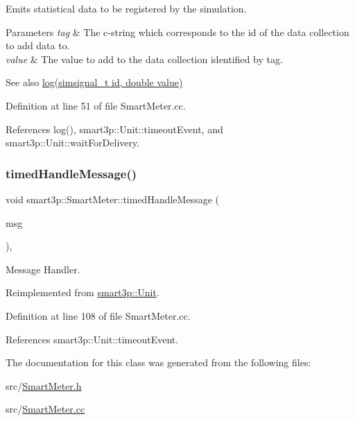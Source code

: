Emits statistical data to be registered by the simulation. 
\begin{DoxyParams}{Parameters}
{\em tag} & The c-\/string which corresponds to the id of the data collection to add data to. \\
\hline
{\em value} & The value to add to the data collection identified by tag. \\
\hline
\end{DoxyParams}
\begin{DoxySeeAlso}{See also}
\hyperlink{classsmart3p_1_1SmartMeter_ac65e2f27b0a9d2545000baac6e1e574d}{log(simsignal\+\_\+t id, double value)} 
\end{DoxySeeAlso}


Definition at line 51 of file Smart\+Meter.\+cc.



References log(), smart3p\+::\+Unit\+::timeout\+Event, and smart3p\+::\+Unit\+::wait\+For\+Delivery.

\mbox{\label{classsmart3p_1_1SmartMeter_a3491294618643d423e8fd3578eb3a439}} 
\subsubsection{\texorpdfstring{timed\+Handle\+Message()}{timedHandleMessage()}}
{\footnotesize\ttfamily void smart3p\+::\+Smart\+Meter\+::timed\+Handle\+Message (\begin{DoxyParamCaption}\item[{c\+Message $\ast$}]{msg }\end{DoxyParamCaption})\hspace{0.3cm}{\ttfamily [protected]}, {\ttfamily [virtual]}}



Message Handler. 



Reimplemented from \hyperlink{classsmart3p_1_1Unit_a93f16f43dec69d23d8588f3b60c96d69}{smart3p\+::\+Unit}.



Definition at line 108 of file Smart\+Meter.\+cc.



References smart3p\+::\+Unit\+::timeout\+Event.



The documentation for this class was generated from the following files\+:\begin{DoxyCompactItemize}
\item 
src/\hyperlink{SmartMeter_8h}{Smart\+Meter.\+h}\item 
src/\hyperlink{SmartMeter_8cc}{Smart\+Meter.\+cc}\end{DoxyCompactItemize}
